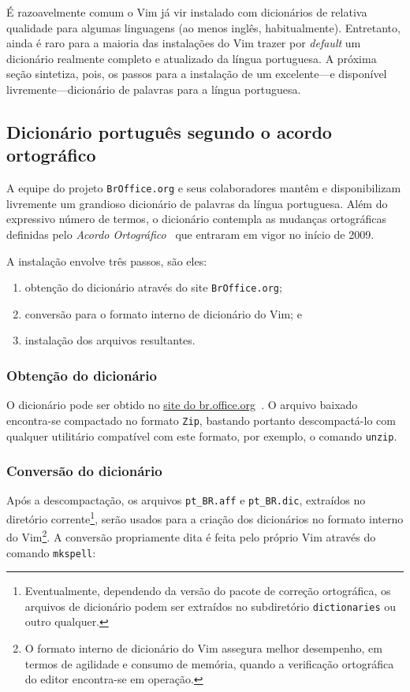 É razoavelmente comum o Vim já vir instalado com dicionários de relativa
qualidade para algumas linguagens (ao menos inglês, habitualmente).
Entretanto, ainda é raro para a maioria das instalações do Vim trazer por {\em
default} um dicionário realmente completo e atualizado da língua portuguesa. A
próxima seção sintetiza, pois, os passos para a instalação de um excelente---e
disponível livremente---dicionário de palavras para a língua portuguesa.

\subsection{Dicionário português segundo o acordo ortográfico}

A equipe do projeto {\tt BrOffice.org} e seus colaboradores mantêm e
disponibilizam livremente um grandioso dicionário de palavras da língua
portuguesa. Além do expressivo número de termos, o dicionário contempla as
mudanças ortográficas definidas pelo {\em Acordo
Ortográfico}~\cite{wiki:acordo_ortografico} que entraram em vigor no início de
2009.

A instalação envolve três passos, são eles: 
\begin{enumerate}
     \item obtenção do dicionário através do site {\tt BrOffice.org}; 
     \item conversão para o formato interno de dicionário do Vim; e 
     \item instalação dos arquivos resultantes.
\end{enumerate}

\subsubsection{Obtenção do dicionário}

O dicionário pode ser obtido no
\href{http://www.broffice.org/verortografico/baixar}{site do
br.office.org}~\cite{DicionarioBroffice}. O arquivo baixado encontra-se
compactado no formato {\tt Zip}, bastando portanto descompactá-lo com qualquer
utilitário compatível com este formato, por exemplo, o comando {\tt unzip}.

\subsubsection{Conversão do dicionário}

Após a descompactação, os arquivos \verb|pt_BR.aff| e \verb|pt_BR.dic|,
extraídos no diretório corrente\footnote{Eventualmente, dependendo da versão
do pacote de correção ortográfica, os arquivos de dicionário podem ser
extraídos no subdiretório {\tt dictionaries} ou outro qualquer.}, serão usados
para a criação dos dicionários no formato interno do Vim\footnote{O formato
interno de dicionário do Vim assegura melhor desempenho, em termos de
agilidade e consumo de memória, quando a verificação ortográfica do editor
encontra-se em operação.}.  A conversão propriamente dita é feita pelo próprio
Vim através do comando {\tt mkspell}:

